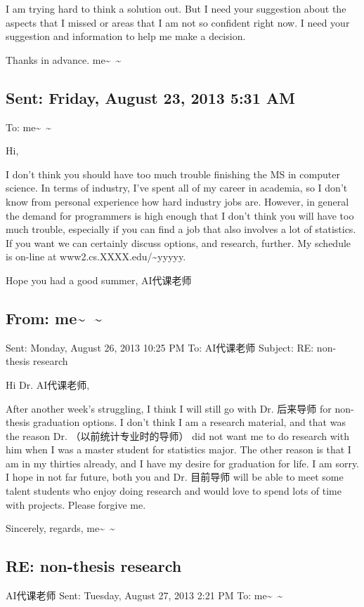 \documentclass[12pt]{book}
\begin{document}
I am trying hard to think a solution out. But I need your suggestion about the aspects that I missed or areas that I am not so confident right now. I need your suggestion and information to help me make a decision. 

Thanks in advance. 
me\textasciitilde{}~\textasciitilde{}

\subsection{Sent: Friday, August 23, 2013 5:31 AM}
\label{sec-8-2-2}
To: me\textasciitilde{}~\textasciitilde{}

Hi,

I don't think you should have too much trouble finishing the MS in computer science.  In terms of industry, I've spent all of my career in academia, so I don't know from personal experience how hard industry jobs are.  However, in general the demand for programmers is high enough that I don't think you will have too much trouble, especially if you can find a job that also involves a lot of statistics.  If you want we can certainly discuss options, and research, further.  My schedule is on-line at www2.cs.XXXX.edu/\textasciitilde{}yyyyy.

Hope you had a good summer,
AI代课老师

\subsection{From: me\textasciitilde{}~\textasciitilde{}}
\label{sec-8-2-3}
Sent: Monday, August 26, 2013 10:25 PM
To: AI代课老师
Subject: RE: non-thesis research

Hi Dr. AI代课老师, 

After another week's struggling, I think I will still go with Dr. 后来导师 for non-thesis graduation options. I don't think I am a research material, and that was the reason Dr. （以前统计专业时的导师） did not want me to do research with him when I was a master student for statistics major. The other reason is that I am in my thirties already, and I have my desire for graduation for life. I am sorry. I hope in not far future, both you and Dr. 目前导师 will be able to meet some talent students who enjoy doing research and would love to spend lots of time with projects. Please forgive me. 

Sincerely, regards, 
me\textasciitilde{}~\textasciitilde{} 

\subsection{RE: non-thesis research}
\label{sec-8-2-4}
AI代课老师
Sent:         Tuesday, August 27, 2013 2:21 PM
To:        
me\textasciitilde{}~\textasciitilde{}
\end{document}
